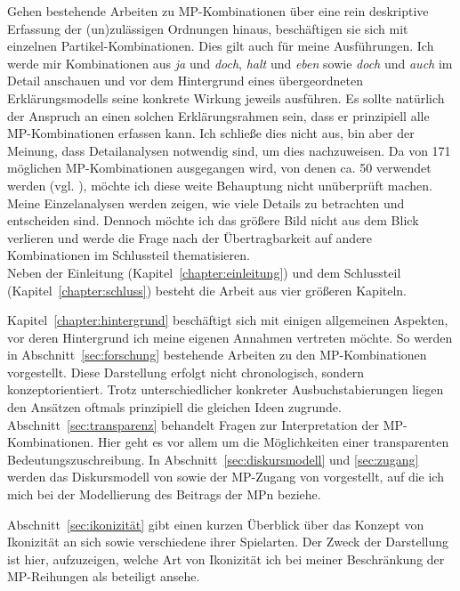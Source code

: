 \noindent
Gehen bestehende Arbeiten zu MP-Kombinationen über eine rein deskriptive Erfassung der (un)zulässigen Ordnungen hinaus, beschäftigen sie sich mit einzelnen Partikel-Kombinationen. Dies gilt auch für meine Ausführungen. Ich werde mir Kombinationen aus \textit{ja} und \textit{doch}, \textit{halt} und \textit{eben} sowie \textit{doch} und \textit{auch} im Detail anschauen und vor dem Hintergrund eines übergeordneten Erklärungsmodells seine konkrete Wirkung jeweils ausführen. Es sollte natürlich der Anspruch an einen solchen Erklärungsrahmen sein, dass er prinzipiell alle MP-Kombinationen erfassen kann. Ich schließe dies nicht aus, bin aber der Meinung, dass Detailana\-lysen notwendig sind, um dies nachzuweisen. Da von 171 möglichen MP-Kombi\-nationen ausgegangen wird, von denen ca. 50 verwendet werden (vgl. \citealt[280]{Thurmair1989}), möchte ich diese weite Behauptung nicht unüberprüft machen. Meine Einzelanalysen werden zeigen, wie viele Details zu betrachten und entscheiden sind. Dennoch möchte ich das größere Bild nicht aus dem Blick verlieren und werde die Frage nach der Übertragbarkeit auf andere Kombinationen im Schluss\-teil thematisieren. \\

\noindent
Neben der Einleitung (Kapitel~\ref{chapter:einleitung}) und dem Schlussteil (Kapitel~\ref{chapter:schluss}) besteht die Arbeit aus vier größeren Kapiteln.
 
Kapitel~\ref{chapter:hintergrund} beschäftigt sich mit einigen allgemeinen Aspekten, vor deren Hintergrund ich meine eigenen Annahmen vertreten möchte. So werden in Abschnitt~\ref{sec:forschung} bestehende Arbeiten zu den MP-Kombinationen vorgestellt. Diese Darstellung erfolgt nicht chronologisch, sondern konzeptorientiert. Trotz unterschiedlicher konkreter Ausbuchstabierungen liegen den Ansätzen oftmals prinzi\-piell die gleichen Ideen zugrunde. Abschnitt~\ref{sec:transparenz} behandelt Fragen zur Interpretation der MP-Kombinationen. Hier geht es vor allem um die Möglichkeiten einer transparenten Bedeutungszuschreibung. In Abschnitt~\ref{sec:diskursmodell} und \ref{sec:zugang} werden das Diskursmodell von \cite{Farkas2010} sowie der MP-Zugang von \cite{Diewald1998} vorgestellt, auf die ich mich bei der Modellierung des Beitrags der MPn beziehe. 

Abschnitt~\ref{sec:ikonizität} gibt einen kurzen Überblick über das Konzept von Ikonizität an sich sowie verschiedene ihrer Spielarten. Der Zweck der Darstellung ist hier, aufzu\-zeigen, welche Art von Ikonizität ich bei meiner Beschränkung der MP-Reihungen als beteiligt ansehe.

